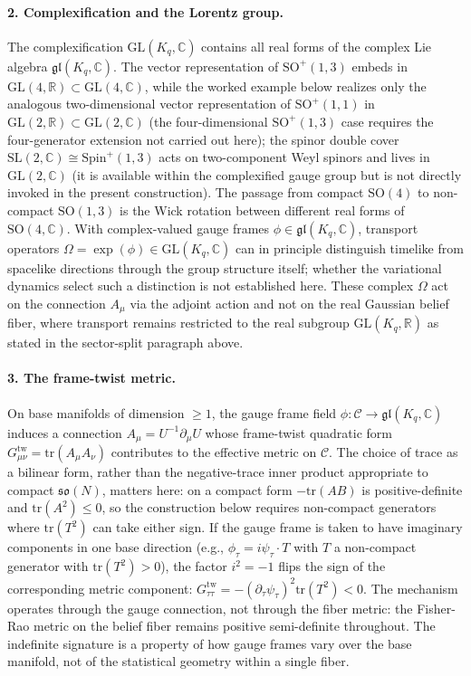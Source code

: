 \documentclass[11pt]{article}
\begin{document}
\paragraph{2. Complexification and the Lorentz group.} The complexification $\mathrm{GL}(K_q, \mathbb{C})$ contains all real forms of the complex Lie algebra $\mathfrak{gl}(K_q, \mathbb{C})$. The vector representation of $\mathrm{SO}^+(1,3)$ embeds in $\mathrm{GL}(4,\mathbb{R}) \subset \mathrm{GL}(4,\mathbb{C})$, while the worked example below realizes only the analogous two-dimensional vector representation of $\mathrm{SO}^+(1,1)$ in $\mathrm{GL}(2,\mathbb{R}) \subset \mathrm{GL}(2,\mathbb{C})$ (the four-dimensional $\mathrm{SO}^+(1,3)$ case requires the four-generator extension not carried out here); the spinor double cover $\mathrm{SL}(2,\mathbb{C}) \cong \mathrm{Spin}^+(1,3)$ acts on two-component Weyl spinors and lives in $\mathrm{GL}(2,\mathbb{C})$ (it is available within the complexified gauge group but is not directly invoked in the present construction). The passage from compact $\mathrm{SO}(4)$ to non-compact $\mathrm{SO}(1,3)$ is the Wick rotation between different real forms of $\mathrm{SO}(4, \mathbb{C})$. With complex-valued gauge frames $\phi \in \mathfrak{gl}(K_q, \mathbb{C})$, transport operators $\Omega = \exp(\phi) \in \mathrm{GL}(K_q, \mathbb{C})$ can in principle distinguish timelike from spacelike directions through the group structure itself; whether the variational dynamics select such a distinction is not established here. These complex $\Omega$ act on the connection $A_\mu$ via the adjoint action and not on the real Gaussian belief fiber, where transport remains restricted to the real subgroup $\mathrm{GL}(K_q, \mathbb{R})$ as stated in the sector-split paragraph above.

\paragraph{3. The frame-twist metric.} On base manifolds of dimension $\geq 1$, the gauge frame field $\phi: \mathcal{C} \to \mathfrak{gl}(K_q, \mathbb{C})$ induces a connection $A_\mu = U^{-1}\partial_\mu U$ whose frame-twist quadratic form $G_{\mu\nu}^{\mathrm{tw}} = \mathrm{tr}(A_\mu A_\nu)$ contributes to the effective metric on $\mathcal{C}$. The choice of trace as a bilinear form, rather than the negative-trace inner product appropriate to compact $\mathfrak{so}(N)$, matters here: on a compact form $-\mathrm{tr}(AB)$ is positive-definite and $\mathrm{tr}(A^2) \le 0$, so the construction below requires non-compact generators where $\mathrm{tr}(T^2)$ can take either sign. If the gauge frame is taken to have imaginary components in one base direction (e.g., $\phi_\tau = i\psi_\tau \cdot T$ with $T$ a non-compact generator with $\mathrm{tr}(T^2) > 0$), the factor $i^2 = -1$ flips the sign of the corresponding metric component: $G_{\tau\tau}^{\mathrm{tw}} = -(\partial_\tau \psi_\tau)^2 \mathrm{tr}(T^2) < 0$. The mechanism operates through the gauge connection, not through the fiber metric: the Fisher-Rao metric on the belief fiber remains positive semi-definite throughout. The indefinite signature is a property of how gauge frames vary over the base manifold, not of the statistical geometry within a single fiber.
\end{document}
